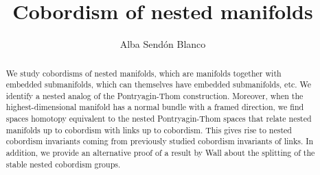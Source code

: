 \documentclass[a4paper, 11pt,reqno]{amsart}
\title{Cobordism of nested manifolds}
\author[A. Send\'{o}n Blanco]{Alba Send\'{o}n Blanco}
\theoremstyle{plain}
\theoremstyle{definition}
\begin{document}
\begin{abstract}
We study cobordisms of nested manifolds, which are manifolds together with embedded submanifolds, which can themselves have embedded submanifolds, etc. We identify a nested analog of the Pontryagin-Thom construction. Moreover, when the highest-dimensional manifold has a normal bundle with a framed direction, we find spaces homotopy equivalent to the nested Pontryagin-Thom spaces that relate nested manifolds up to cobordism with links up to cobordism. This gives rise to nested cobordism invariants coming from previously studied cobordism invariants of links. In addition, we provide an alternative proof of a result by Wall about the splitting of the stable nested cobordism groups.
\end{abstract}

\maketitle

\setlength{\parskip}{0px}
\tableofcontents

\setlength{\parskip}{5px}
\end{document}
